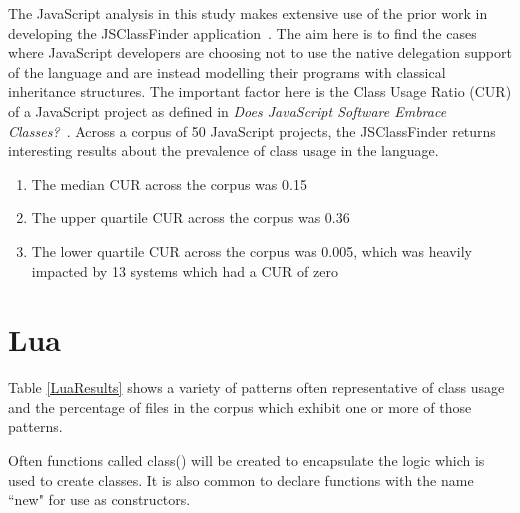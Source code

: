 The JavaScript analysis in this study makes extensive use of the prior work in developing the JSClassFinder application~\cite{JSClassFinder}. The aim here is to find the cases where JavaScript developers are choosing not to use the native delegation support of the language and are instead modelling their programs with classical inheritance structures. The important factor here is the Class Usage Ratio (CUR) of a JavaScript project as defined in \textit{Does JavaScript Software Embrace Classes?~\cite{JSClassFinder}}. Across a corpus of 50 JavaScript projects, the JSClassFinder returns interesting results about the prevalence of class usage in the language.
\begin{enumerate}
	\item The median CUR across the corpus was 0.15
	\item The upper quartile CUR across the corpus was 0.36
	\item The lower quartile CUR across the corpus was 0.005, which was heavily impacted by 13 systems which had a CUR of zero
\end{enumerate}
\section{Lua}
Table \ref{LuaResults} shows a variety of patterns often representative of class usage and the percentage of files in the corpus which exhibit one or more of those patterns.\newline

Often functions called class() will be created to encapsulate the  logic which is used to create classes. It is also common to declare functions with the name ``new" for use as constructors.

